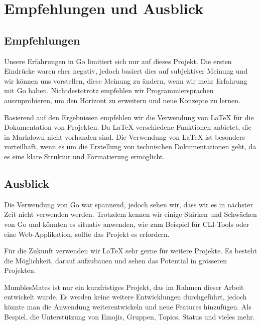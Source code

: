 \section{Empfehlungen und Ausblick}

\subsection{Empfehlungen}

Unsere Erfahrungen in Go limitiert sich nur auf dieses Projekt. Die ersten Eindrücke waren eher negativ, jedoch basiert dies auf subjektiver Meinung und wir können uns vorstellen, diese Meinung zu ändern, wenn wir mehr Erfahrung mit Go haben. Nichtdestotrotz empfehlen wir Programmiersprachen auszuprobieren, um den Horizont zu erweitern und neue Konzepte zu lernen.
\newline

Basierend auf den Ergebnissen empfehlen wir die Verwendung von LaTeX für die Dokumentation von Projekten. Da LaTeX verschiedene Funktionen anbietet, die in Markdown nicht vorhanden sind. Die Verwendung von LaTeX ist besonders vorteilhaft, wenn es um die Erstellung von technischen Dokumentationen geht, da es eine klare Struktur und Formatierung ermöglicht.

\subsection{Ausblick}

Die Verwendung von Go war spannend, jedoch sehen wir, dass wir es in nächster Zeit nicht verwenden werden. Trotzdem kennen wir einige Stärken und Schwächen von Go und könnten es situativ anwenden, wie zum Beispiel für CLI-Tools oder eine Web-Applikation, sollte das Projekt es erfordern.
\newline

Für die Zukunft verwenden wir LaTeX sehr gerne für weitere Projekte. Es besteht die Möglichkeit, darauf aufzubauen und sehen das Potential in grösseren Projekten.
\newline

MumblesMates ist nur ein kurzfristiges Projekt, das im Rahmen dieser Arbeit entwickelt wurde.
Es werden keine weitere Entwicklungen durchgeführt, jedoch könnte man die Anwendung weiterentwickeln und neue Features hinzufügen. Als Bespiel, die Unterstützung von Emojis, Gruppen, Topics, Status und vieles mehr.
\newline

